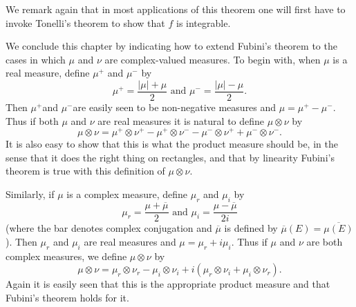 We remark again that in most applications of this theorem one will first have to invoke Tonelli's theorem to show that $f$ is integrable.

We conclude this chapter by indicating how to extend Fubini's theorem to the cases in which $\mu$ and $\nu$ are complex-valued measures. To begin with, when $\mu$ is a real measure, define $\mu^+$ and $\mu^-$ by $$\mu^+=\frac{|\mu|+\mu}2\text{ and }\mu^-=\frac{|\mu|-\mu}2.$$ Then $\mu^+$and $\mu^-$are easily seen to be non-negative measures and $\mu=\mu^+-\mu^-$. Thus if both $\mu$ and $\nu$ are real measures it is natural to define $\mu\otimes\nu$ by $$\mu\otimes\nu=\mu^+\otimes\nu^+-\mu^+\otimes\nu^--\mu^-\otimes\nu^++\mu^-\otimes\nu^-.$$ It is also easy to show that this is what the product measure should be, in the sense that it does the right thing on rectangles, and that by linearity Fubini's theorem is true with this definition of $\mu\otimes\nu$.

Similarly, if $\mu$ is a complex measure, define $\mu_r$ and $\mu_i$ by $$\mu_r=\frac{\mu+\overline{\mu}}2\text{ and }\mu_i=\frac{\mu-\overline{\mu}}{2i}$$ (where the bar denotes complex conjugation and $\overline{\mu}$ is defined by $\overline{\mu}(E)=\overline{\mu(E)}$). Then $\mu_r$ and $\mu_i$ are real measures and $\mu=\mu_r+i\mu_i$. Thus if $\mu$ and $\nu$ are both complex measures, we define $\mu\otimes\nu$ by $$\mu\otimes\nu=\mu_r\otimes\nu_r-\mu_i\otimes\nu_i+i(\mu_r\otimes\nu_i+\mu_i\otimes\nu_r).$$ Again it is easily seen that this is the appropriate product measure and that Fubini's theorem holds for it.